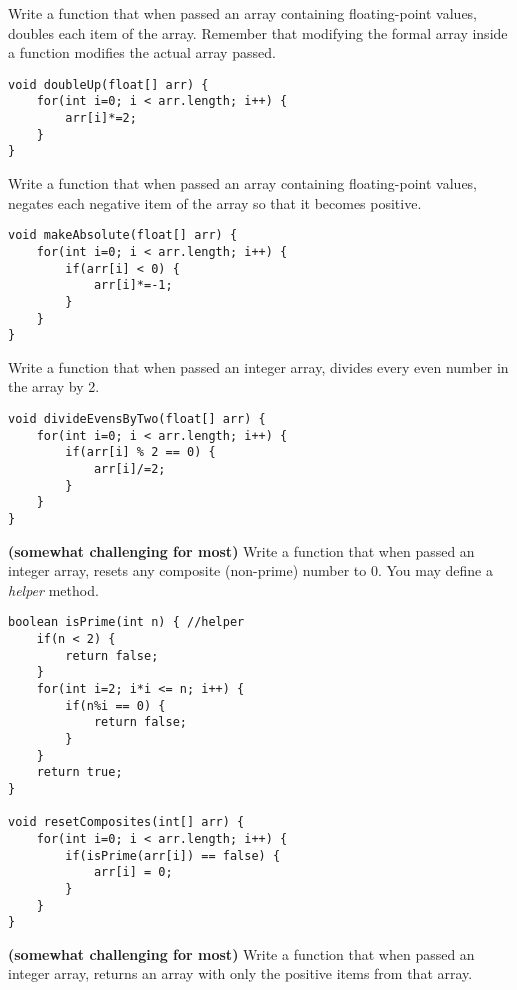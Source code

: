 \begin{questions}
\question Write a function that when passed an array containing floating-point values, doubles each item of the array. Remember that modifying the formal array inside a function modifies the actual array passed.

\begin{solution}
\begin{lstlisting}
void doubleUp(float[] arr) {
	for(int i=0; i < arr.length; i++) {
		arr[i]*=2;
	}
}
\end{lstlisting}	
\end{solution}

\question Write a function that when passed an array containing floating-point values, negates each negative item of the array so that it becomes positive.

\begin{solution}
\begin{lstlisting}
void makeAbsolute(float[] arr) {
	for(int i=0; i < arr.length; i++) {
		if(arr[i] < 0) {
			arr[i]*=-1;
		}
	}
}
\end{lstlisting}	
\end{solution}

\question Write a function that when passed an integer array, divides every even number in the array by 2.

\begin{solution}
\begin{lstlisting}
void divideEvensByTwo(float[] arr) {
	for(int i=0; i < arr.length; i++) {
		if(arr[i] % 2 == 0) {
			arr[i]/=2;
		}
	}
}	
\end{lstlisting}	
\end{solution}

\question \textbf{(somewhat challenging for most)} Write a function that when passed an integer array, resets any composite (non-prime) number to 0. You may define a \emph{helper} method.

\begin{solution}
\begin{lstlisting}
boolean isPrime(int n) { //helper
	if(n < 2) {
		return false;
	}
	for(int i=2; i*i <= n; i++) {
		if(n%i == 0) {
			return false;
		}	
	}
	return true;
}

void resetComposites(int[] arr) {
	for(int i=0; i < arr.length; i++) {
		if(isPrime(arr[i]) == false) {
			arr[i] = 0;
		}
	}
}	
\end{lstlisting}	
\end{solution}

\question \textbf{(somewhat challenging for most)} Write a function that when passed an integer array, returns an array with only the positive items from that array.


\end{questions}
